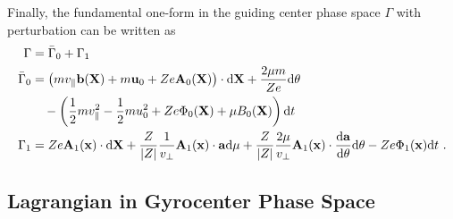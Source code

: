 Finally, the fundamental one-form in the guiding center phase space $\Gamma$ with perturbation can be written as
\begin{gather}
    \begin{aligned}
        \Gamma        &= \bar{\Gamma}_0 + \Gamma_1 \\
        \bar{\Gamma}_0 &= \left(m v_\parallel \boldsymbol{\mathbf{b}}(\boldsymbol{\mathbf{X}}) + m\boldsymbol{\mathbf{u}}_0 + Ze\boldsymbol{\mathbf{A}}_0(\boldsymbol{\mathbf{X}})\right) \cdot \mathrm{d}\boldsymbol{\mathbf{X}} + \frac{2\mu m}{Ze} \mathrm{d}\theta \\
                      &\quad - \left(\frac{1}{2}mv_\parallel^2 - \frac{1}{2}mu_0^2 + Ze\Phi_0(\boldsymbol{\mathbf{X}}) + \mu B_0(\boldsymbol{\mathbf{X}}) \right) \mathrm{d}t \\
        \Gamma_1      &= Ze\boldsymbol{\mathbf{A}}_{1}(\boldsymbol{\mathbf{x}}) \cdot \mathrm{d}\boldsymbol{\mathbf{X}} + \frac{Z}{\abs{Z}} \frac{1}{v_\perp} \boldsymbol{\mathbf{A}}_1(\boldsymbol{\mathbf{x}}) \cdot \boldsymbol{\mathbf{a}} \mathrm{d}\mu + \frac{Z}{\abs{Z}} \frac{2\mu}{v_\perp} \boldsymbol{\mathbf{A}}_1(\boldsymbol{\mathbf{x}}) \cdot \frac{\mathrm{d}\boldsymbol{\mathbf{a}}}{\mathrm{d}\theta} \mathrm{d}\theta - Ze \Phi_1(\boldsymbol{\mathbf{x}}) \mathrm{d}t~. 
    \end{aligned}
\end{gather}

\newpage

\subsection{Lagrangian in Gyrocenter Phase Space}
\label{sub:gyrocenterLagrangian}

